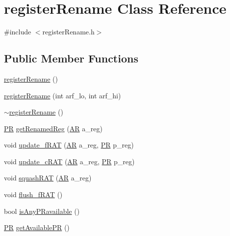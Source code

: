 \hypertarget{classregisterRename}{
\section{registerRename Class Reference}
\label{classregisterRename}
}


{\ttfamily \#include $<$registerRename.h$>$}

\subsection*{Public Member Functions}
\begin{DoxyCompactItemize}
\item 
\hyperlink{classregisterRename_a95ee892e2c48b4a95175cddf7729f4fd}{registerRename} ()
\item 
\hyperlink{classregisterRename_a36b9a5a837c46fc2a9b4b23752047139}{registerRename} (int arf\_\-lo, int arf\_\-hi)
\item 
\hyperlink{classregisterRename_a04cc5008f41dedc944f53c9e5a482b12}{$\sim$registerRename} ()
\item 
\hyperlink{global_2global_8h_a54dcae2ba04c76c12afe113b706bd4dc}{PR} \hyperlink{classregisterRename_a0c6a47ff2437f76f6577609ebea23ce8}{getRenamedReg} (\hyperlink{global_2global_8h_a735ca3cb7fa17e60af6701a846722516}{AR} a\_\-reg)
\item 
void \hyperlink{classregisterRename_a28a11ff6b483aba951f8a88280a8695d}{update\_\-fRAT} (\hyperlink{global_2global_8h_a735ca3cb7fa17e60af6701a846722516}{AR} a\_\-reg, \hyperlink{global_2global_8h_a54dcae2ba04c76c12afe113b706bd4dc}{PR} p\_\-reg)
\item 
void \hyperlink{classregisterRename_ae45ea1c346f9d31c032672f18123e7b8}{update\_\-cRAT} (\hyperlink{global_2global_8h_a735ca3cb7fa17e60af6701a846722516}{AR} a\_\-reg, \hyperlink{global_2global_8h_a54dcae2ba04c76c12afe113b706bd4dc}{PR} p\_\-reg)
\item 
void \hyperlink{classregisterRename_afd0ae2c9363f1f9067da25ef2ff03001}{squashRAT} (\hyperlink{global_2global_8h_a735ca3cb7fa17e60af6701a846722516}{AR} a\_\-reg)
\item 
void \hyperlink{classregisterRename_a6784336e03b69e69d69de839a0ab1b07}{flush\_\-fRAT} ()
\item 
bool \hyperlink{classregisterRename_ae0834c228a3bf0f44ca603556b583046}{isAnyPRavailable} ()
\item 
\hyperlink{global_2global_8h_a54dcae2ba04c76c12afe113b706bd4dc}{PR} \hyperlink{classregisterRename_a7770265e6fed2584304a0d80f35efa04}{getAvailablePR} ()

\end{DoxyCompactItemize}
